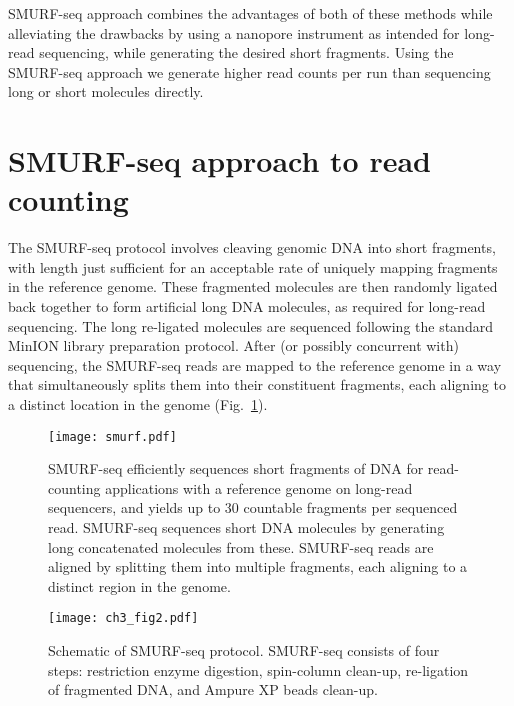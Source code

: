 SMURF-seq approach combines the advantages of both of these methods
while alleviating the drawbacks by using a nanopore instrument as
intended for long-read sequencing, while generating the desired short
fragments. Using the SMURF-seq approach we generate higher read counts per
run than sequencing long or short molecules directly.


\section{SMURF-seq approach to read counting}
The SMURF-seq protocol involves cleaving genomic DNA into short
fragments, with length just sufficient for an acceptable rate of
uniquely mapping fragments in the reference genome.  These fragmented
molecules are then randomly ligated back together to form artificial
long DNA molecules, as required for long-read sequencing. The long
re-ligated molecules are sequenced following the standard MinION library
preparation protocol. After (or possibly concurrent with) sequencing,
the SMURF-seq reads are mapped to the reference genome in a way that
simultaneously splits them into their constituent fragments, each
aligning to a distinct location in the genome (Fig.~\ref{smurf}).

\begin{figure}[b!]
\centering
\texttt{[image: smurf.pdf]}
\caption{
  SMURF-seq efficiently sequences short fragments of DNA for
  read-counting applications with a reference genome on long-read
  sequencers, and yields up to 30 countable fragments per sequenced read.
  SMURF-seq sequences short DNA molecules by generating long concatenated
  molecules from these.  SMURF-seq reads are aligned by splitting them
  into multiple fragments, each aligning to a distinct region in the
  genome.}
\label{smurf}
\end{figure}


\begin{figure}[t!]
\centering
\texttt{[image: ch3\_fig2.pdf]}
\caption{Schematic of SMURF-seq protocol. SMURF-seq consists of four
  steps: restriction enzyme digestion, spin-column clean-up, re-ligation
  of fragmented DNA, and Ampure XP beads clean-up.}
\label{protocol}
\end{figure}

